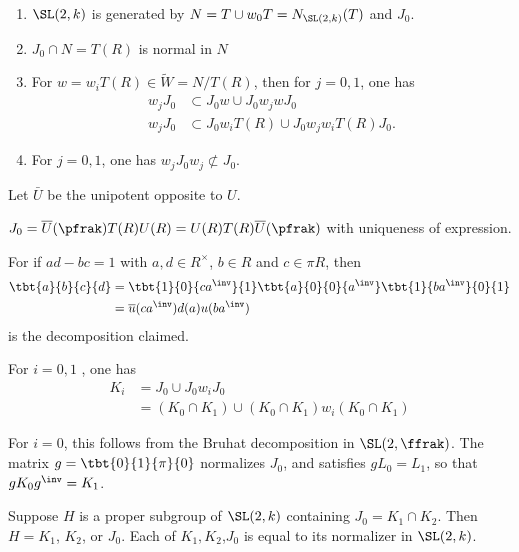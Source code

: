 \documentclass{book}
\begin{document}
\begin{proposition}
    \begin{enumerate}
        \item $\SL(2,k)$ is generated by $N=T\cup w_0 T = N_{\SL(2,k)}(T)$ and $J_0$.
        \item $J_0 \cap N = T(R)$ is normal in $N$
        \item For $w=w_i T(R) \in  \tilde{W} = N/T(R)$, then for $j=0,1$, one has
              \begin{align*}
                  w_j J_0 & \subset J_0 w \cup J_0 w_j w J_0               \\
                  w_j J_0 & \subset J_0 w_i T(R) \cup J_0 w_jw_i T(R) J_0.
              \end{align*}
        \item For $j=0,1$, one has $w_j J_0 w_j \not\subset J_0$.
    \end{enumerate}
\end{proposition}

Let $\bar{U}$ be the unipotent opposite to $U$.
\begin{lemma}
    $J_0 = \overline{U}(\pfrak) T(R) U(R) = U(R) T(R) \overline{U}(\pfrak)$ with uniqueness of expression.
\end{lemma}
For if $ad-bc=1$ with $a,d \in R^\times$, $b \in R$ and $c \in \pi R$, then
\begin{align*}
    \tbt{a}{b}{c}{d} & = \tbt{1}{0}{ca^\inv}{1}\tbt{a}{0}{0}{a^\inv}\tbt{1}{ba^\inv}{0}{1} \\
                     & = \overline{u}(ca^\inv)d(a)u(ba^\inv)
\end{align*}
is the decomposition claimed.


\begin{lemma}
    For $i =0,1$ , one has
    \begin{align*}
        K_i & = J_0 \cup J_0 w_i J_0                                \\
            & = (K_0\cap K_1) \cup (K_0 \cap K_1) w_i (K_0\cap K_1)
    \end{align*}
\end{lemma}
For $i=0$, this follows from the Bruhat decomposition in $\SL(2,\ffrak)$.
The matrix $g = \tbt{0}{1}{\pi}{0}$ normalizes $J_0$, and satisfies $g L_0 = L_1$, so that $gK_0g^\inv = K_1$.

\begin{lemma}
    Suppose $H$ is a proper subgroup of $\SL(2,k)$ containing $J_0 = K_1 \cap K_2$. Then $H = K_1$, $K_2$, or $J_0$.  Each of $K_1,K_2$,$J_0$ is equal to its normalizer in $\SL(2,k)$.
\end{lemma}
\end{document}
